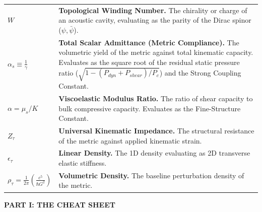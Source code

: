 \begin{tcolorbox}[colback=white, colframe=academiabrown!90!black, arc=1mm, boxrule=0.8pt, title={\textbf{TABLE 1: KINEMATIC NOMENCLATURE \& METRIC CONSTANTS}}]
\begin{tabular}{p{} p{}}
    $W$ & \textbf{Topological Winding Number.} The chirality or charge of an acoustic cavity, evaluating as the parity of the Dirac spinor ($\psi, \bar{\psi}$). \\
    $\alpha_s \equiv \frac{1}{\gamma}$ & \textbf{Total Scalar Admittance (Metric Compliance).} The volumetric yield of the metric against total kinematic capacity. Evaluates as the square root of the residual static pressure ratio ($\sqrt{1 - (P_{dyn} + P_{shear})/P_c}$) and the Strong Coupling Constant. \\ 
    $\alpha = \mu_s / K$ & \textbf{Viscoelastic Modulus Ratio.} The ratio of shear capacity to bulk compressive capacity. Evaluates as the Fine-Structure Constant. \\
    $Z_{\tau}$ & \textbf{Universal Kinematic Impedance.} The structural resistance of the metric against applied kinematic strain.  \\ 
    $\epsilon_{\tau}$ & \textbf{Linear Density.} The 1D density evaluating as 2D transverse elastic stiffness. \\
    $\rho_{\tau} = \frac{1}{2\pi}\left(\frac{c^5}{\hbar G^2}\right)$ & \textbf{Volumetric Density.} The baseline perturbation density of the metric. \\ 
\end{tabular}
\end{tcolorbox}
\newpage
\begin{center}
    \LARGE\textbf{PART I: THE CHEAT SHEET}
\end{center}
\vspace{0.2cm}

